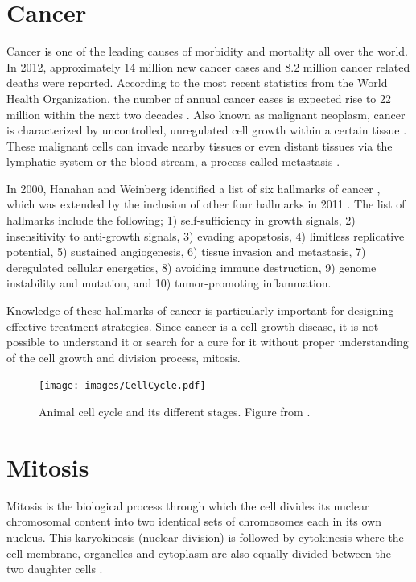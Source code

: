 \documentclass[11pt]{report}
\begin{document}
\section{Cancer}
\label{s:I-Cancer}

Cancer is one of the leading causes of morbidity and mortality 
all over the world. In 2012, approximately 14 million
new cancer cases and 8.2 million cancer related deaths were
reported. According to the most recent statistics from the World Health Organization, the number of annual cancer cases is expected rise to 22 million within the next two decades \cite{wcr2014}. Also known as malignant neoplasm, cancer
is characterized by uncontrolled, unregulated cell growth within
a certain tissue \cite{nciDef}. These malignant cells can invade nearby tissues
or even distant tissues via the lymphatic system or the blood
stream, a process called metastasis \cite{nciMeta}.

In 2000, Hanahan and Weinberg identified a list of six hallmarks of cancer \cite{Hanahan2000}, which was extended by the inclusion of other four hallmarks in 2011 \cite{Hanahan2011}. The list of hallmarks include the following; 1) self-sufficiency in growth signals, 2) insensitivity to anti-growth signals, 3) evading apopstosis, 4) limitless replicative potential, 5) sustained angiogenesis,
6) tissue invasion and metastasis, 7) deregulated cellular energetics, 8) avoiding immune destruction, 
9) genome instability and mutation, and 10) tumor-promoting inflammation.

Knowledge of these hallmarks of cancer is particularly important for designing effective treatment strategies. Since cancer is 
a cell growth disease, it is not possible to understand it 
or search for a cure for it without proper understanding of the
cell growth and division process, mitosis.

\begin{figure}
  \centering
  \texttt{[image: images/CellCycle.pdf]}
  \caption[Animal cell cycle]{Animal cell cycle and its different stages. Figure from \cite{Mitosis}.}
  \label{f:I-CellCycle}
\end{figure}

\section{Mitosis}

Mitosis is the biological process through which
the cell divides its nuclear chromosomal content into two identical sets of chromosomes each in its own nucleus.
This karyokinesis (nuclear division) is followed by
cytokinesis where the cell membrane, organelles and cytoplasm
are also equally divided between the two daughter cells
\cite{Campbell1999}.
\end{document}
